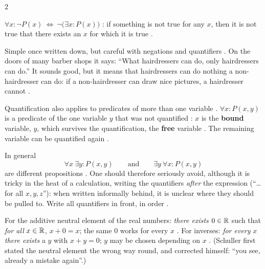 \begin{paracol}{2}
\begin{corollary}\label{cor:lo-neg}
$\forall x\colon\neg P(x)\ \Leftrightarrow\ \neg\bigl(\exists x\colon P(x)\bigr)$ : if something is
not true for any $x$, then it is not true that there exists an $x$ for which it is true .
\end{corollary}

\begin{aside}
Simple once written down, but careful with negations and quantifiers . On the doors of many
barber shops it says: ``What hairdressers can do, only hairdressers can do.'' It sounds good, but it means that
hairdressers can do nothing a non-hairdresser can do: if a non-hairdresser can draw nice pictures, a hairdresser
cannot .
\end{aside}

\begin{remark}\label{rem:lo-free}
Quantification also applies to predicates of more than one variable . $\forall x\colon P(x,y)$ is a
predicate of the one variable $y$ that was not quantified : $x$ is the \textbf{bound} variable,
$y$, which survives the quantification, the \textbf{free} variable . The remaining variable can
be quantified again .
\end{remark}

\begin{remark}\label{rem:lo-order}
In general 
\[
  \forall x\ \exists y\colon P(x,y)\qquad\text{and}\qquad \exists y\ \forall x\colon P(x,y)
\]
are different propositions . One should therefore seriously avoid, although it is tricky in the
heat of a calculation, writing the quantifiers \emph{after} the expression (``\dots for all $x,y,z$''): when
written informally behind, it is unclear where they should be pulled to. Write all quantifiers in front, in
order .
\end{remark}

\begin{example}
For the additive neutral element of the real numbers: \emph{there exists} $0\in\mathbb{R}$ such that \emph{for all}
$x\in\mathbb{R}$, $x+0=x$; the same $0$ works for every $x$ . For inverses: \emph{for every} $x$ \emph{there
exists} a $y$ with $x+y=0$; $y$ may be chosen depending on $x$ . (Schuller first stated the
neutral element the wrong way round, and corrected himself: ``you see, already a mistake again''.)
\end{example}


\end{paracol}
